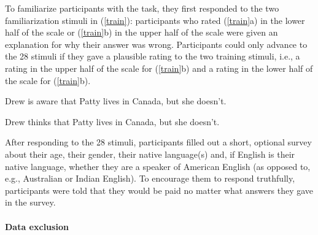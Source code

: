\documentclass[11pt,fleqn]{article}
\newcommand{\6}{\mbox{$[\hspace*{-.6mm}[$}}
\newcommand{\9}{\mbox{$]\hspace*{-.6mm}]$}}
\begin{document}
{To familiarize participants with the task, they first responded to the two familiarization stimuli in (\ref{train}): participants who rated (\ref{train}a) in the lower half of the scale or (\ref{train}b) in the upper half of the scale were given an explanation for why their answer was wrong. Participants could only advance to the 28 stimuli if they gave a plausible rating to the two training stimuli, i.e., a rating in the upper half of the scale for (\ref{train}b) and a rating in the lower half of the scale for (\ref{train}b).

\begin{exe}
\ex\label{train}
\begin{xlist}
\ex Drew is aware that Patty lives in Canada, but she doesn't.

\ex Drew thinks that Patty lives in Canada, but she doesn't.
\end{xlist}
\end{exe}

After responding to the 28 stimuli, participants filled out a short, optional survey about their age, their gender, their native language(s) and, if English is their native language, whether they are a speaker of American English (as opposed to, e.g., Australian or Indian English). To encourage them to respond truthfully, participants were told that they would be paid no matter what answers they gave in the survey.

\paragraph{Data exclusion}

}
\end{document}
